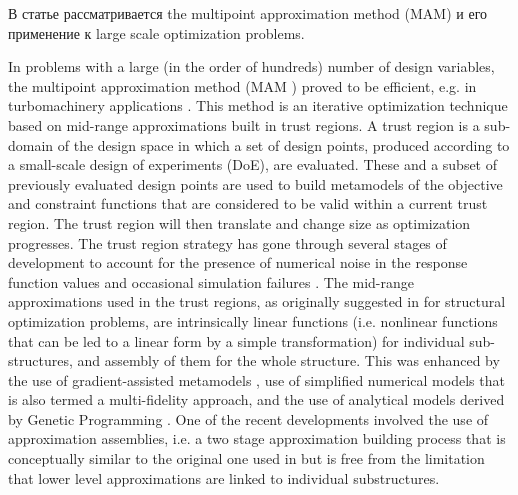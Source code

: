 \documentclass[runningheads,a4paper]{llncs}
\begin{document}
\Russian
В статье рассматривается the multipoint approximation method (MAM) и его применение к large scale optimization problems. 

In problems with a large (in the order of hundreds) number of design variables, the multipoint approximation method (MAM \cite{Toropov1989,Toropov1992,ToropovFilatov1993}) proved to be efficient, e.g. in turbomachinery applications \cite{ShahparPolynkinToropov2008,PolynkinToropovShahpar2008,PolynkinToropovShahpar2010} . This method is an iterative optimization technique based on mid-range approximations built in trust regions. A trust region is a sub-domain of the design space in which a set of design points, produced according to a small-scale design of experiments (DoE), are evaluated. These and a subset of previously evaluated design points are used to build metamodels of the objective and constraint functions that are considered to be valid within a current trust region. The trust region will then translate and change size as optimization progresses. The trust region strategy has gone through several stages of development to account for the presence of numerical noise in the response function values \cite{KeulenToropovMarkine1996,ToropovKeulenMarkine1996} and occasional simulation failures \cite{ToropovMarkineHolden1999}. The mid-range approximations used in the trust regions, as originally suggested in \cite{Toropov1989} for structural optimization problems, are intrinsically linear functions (i.e. nonlinear functions that can be led to a linear form by a simple transformation) for individual sub-structures, and assembly of them for the whole structure. This was enhanced by the use of gradient-assisted metamodels \cite{ToropovFilatov1993}, use of simplified numerical models that is also termed a multi-fidelity approach,\cite{ToropovMarkine1996} and the use of analytical models derived by Genetic Programming \cite{ToropovAlvarez1998}. One of the recent developments \cite{PolynkinToropov2012} involved the use of approximation assemblies, i.e. a two stage approximation building process that is conceptually similar to the original one used in \cite{Toropov1989} but is free from the limitation that lower level approximations are linked to individual substructures.
\end{document}
